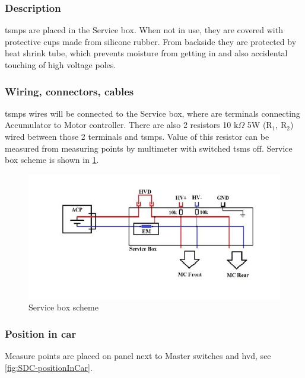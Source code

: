 \subsubsection{Description}

\Glspl{tsmp} are placed in the Service box. When not in use, they are covered with protective cups made from silicone rubber. From backside they are protected by heat shrink tube, which prevents moisture from getting in and also accidental touching of high voltage poles.

\subsubsection{Wiring, connectors, cables}

\Glspl{tsmp} wires will be connected to the Service box, where are terminals connecting Accumulator to Motor controller. There are also 2 resistors 10 k$\Omega$ 5W (R$_1$, R$_2$) wired between those 2 terminals and \glspl{tsmp}. Value of this resistor can be measured from measuring points by multimeter with switched \gls{tsms} off. Service box scheme is shown in \ref{fig:ServiceBox/scheme}.

\begin{figure}[H]
	\includegraphics[width=\textwidth]{./img/ServiceBox-scheme.jpg}
	\caption{Service box scheme}
	\label{fig:ServiceBox/scheme}
\end{figure}

\subsubsection{Position in car}

Measure points are placed on panel next to Master switches and \gls{hvd}, see \ref{fig:SDC-positionInCar}.